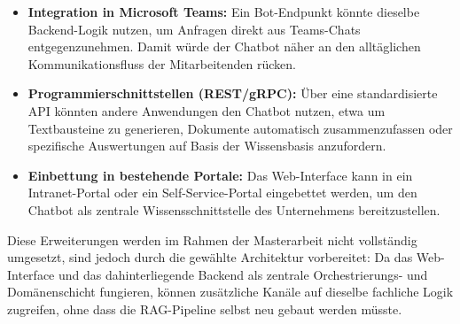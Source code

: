 \begin{itemize}
    \item \textbf{Integration in Microsoft Teams:}
    Ein Bot-Endpunkt könnte dieselbe Backend-Logik nutzen, um Anfragen direkt aus Teams-Chats entgegenzunehmen.
    Damit würde der Chatbot näher an den alltäglichen Kommunikationsfluss der Mitarbeitenden rücken.

    \item \textbf{Programmierschnittstellen (REST/gRPC):}
    Über eine standardisierte API könnten andere Anwendungen den Chatbot nutzen, etwa um Textbausteine zu generieren, Dokumente automatisch zusammenzufassen oder spezifische Auswertungen auf Basis der Wissensbasis anzufordern.

    \item \textbf{Einbettung in bestehende Portale:}
    Das Web-Interface kann in ein Intranet-Portal oder ein Self-Service-Portal eingebettet werden, um den Chatbot als zentrale Wissensschnittstelle des Unternehmens bereitzustellen.
\end{itemize}

Diese Erweiterungen werden im Rahmen der Masterarbeit nicht vollständig umgesetzt, sind jedoch durch die gewählte Architektur vorbereitet:
Da das Web-Interface und das dahinterliegende Backend als zentrale Orchestrierungs- und Domänenschicht fungieren, können zusätzliche Kanäle auf dieselbe fachliche Logik zugreifen, ohne dass die RAG-Pipeline selbst neu gebaut werden müsste.
